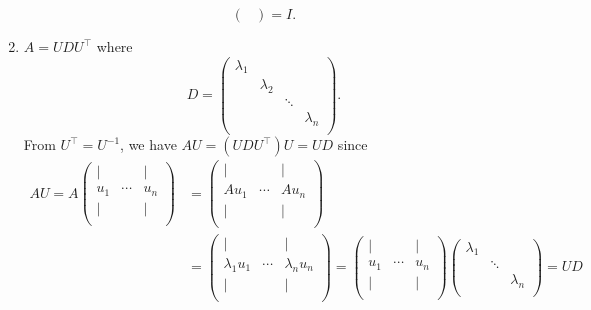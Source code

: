 \begin{prev}
\begin{enumerate}
\[\begin{pmatrix}
			      \end{pmatrix} = I.
		      \]
		\item \(A = U D U^{\top}\)  where \[
			      D  = \begin{pmatrix}
				      \lambda_1 &           &        &           \\
				                & \lambda_2 &        &           \\
				                &           & \ddots &           \\
				                &           &        & \lambda_n \\
			      \end{pmatrix}.
		      \]
		      From \(U^{\top} = U^{-1} \), we have \(A U = (U D U^{\top} ) U = U D\) since
		      \[
			      \begin{split}
				      A U = A \begin{pmatrix}
					      \mid &        & \mid \\
					      u_1  & \cdots & u_n  \\
					      \mid &        & \mid \\
				      \end{pmatrix} &= \begin{pmatrix}
					      \mid  &        & \mid  \\
					      A u_1 & \cdots & A u_n \\
					      \mid  &        & \mid  \\
				      \end{pmatrix}\\ &= \begin{pmatrix}
					      \mid           &        & \mid           \\
					      \lambda _1 u_1 & \cdots & \lambda _n u_n \\
					      \mid           &        & \mid           \\
				      \end{pmatrix} = \begin{pmatrix}
					      \mid &        & \mid \\
					      u_1  & \cdots & u_n  \\
					      \mid &        & \mid \\
				      \end{pmatrix} \begin{pmatrix}
					      \lambda_1 &        &           \\
					                & \ddots &           \\
					                &        & \lambda_n \\
				      \end{pmatrix} = UD
			      \end{split}
		      \]
	\end{enumerate}
\end{prev}

